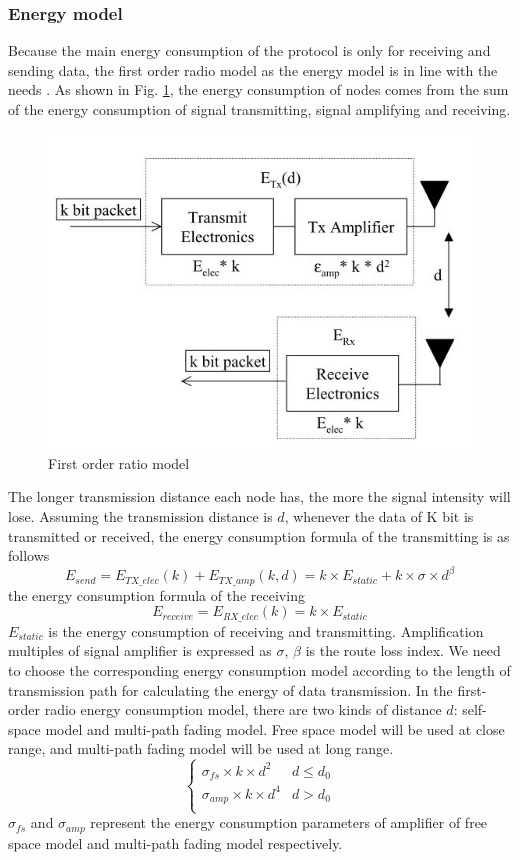 \documentclass[11pt]{report}
\begin{document}
	\subsubsection{Energy model}
	Because the main energy consumption of the protocol is only for receiving and sending data, the first order radio model as the energy model is in line with the needs \cite{1045297}.	As shown in Fig. \ref{fig3}, the energy consumption of nodes comes  from the sum of the energy consumption of signal transmitting, signal amplifying and receiving. 
	\begin{figure}[h!]
		\centering
		\includegraphics[width=0.6\linewidth]{firstordermodel.jpg}
		\caption{First order ratio model}
		\label{fig3}
	\end{figure}
    The longer transmission distance each node has, the more the signal intensity will lose. Assuming the transmission distance is $d$, whenever the data of K bit is transmitted or received, the energy consumption formula of the transmitting is as follows\\
	\begin{equation}
	E_{send} = E_{TX\_elec}(k) + E_{TX\_amp}(k,d) = k\times E_{static} + k\times \sigma\times d^\beta
	\end{equation}
	the energy consumption formula of the receiving
	\begin{equation}
	E_{receive} = E_{RX\_elec}(k) = k \times E_{static}
	\end{equation}
	$E_{static}$ is the energy consumption of receiving and transmitting. Amplification multiples of signal amplifier is expressed as $\sigma$, $\beta$ is the route loss index. We need to choose the corresponding energy consumption model according to the length of transmission path for calculating the energy of data transmission. In the first-order radio energy consumption model, there are two kinds of distance $d$: self-space model and multi-path fading model. Free space model will be used at close range, and multi-path fading model will be used at long range. 
	\begin{equation}
	\left\{ \begin{array}{ll}
	\sigma_{fs}\times k \times d^2 & d \leq d_0 \\
	\sigma_{amp} \times k \times d^4 & d > d_0 \\
	\end{array} \right.
	\end{equation}
	$\sigma_{fs}$ and $\sigma_{amp}$ represent the energy consumption parameters of amplifier of free space model and multi-path fading model respectively.
\end{document}
